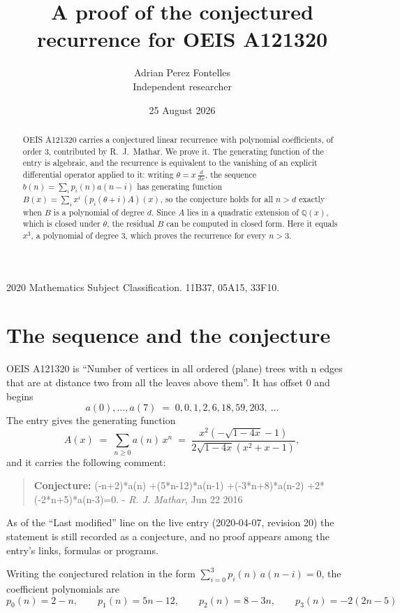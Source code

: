 \documentclass[11pt,a4paper]{article}
\title{A proof of the conjectured recurrence for OEIS A121320}
\author{Adrian Perez Fontelles\\ \small Independent researcher}
\date{25 August 2026}
\theoremstyle{plain}
\theoremstyle{definition}
\begin{document}
\maketitle

\begin{abstract}
OEIS A121320 carries a conjectured linear recurrence with polynomial coefficients, of
order 3, contributed by R.~J.~Mathar. We prove it. The generating function of the
entry is algebraic, and the recurrence is equivalent to the vanishing of an explicit
differential operator applied to it: writing $\theta=x\,\frac{d}{dx}$, the sequence
$b(n)=\sum_{i}p_{i}(n)a(n-i)$ has generating function
$B(x)=\sum_{i}x^{i}\,(p_{i}(\theta+i)A)(x)$, so the conjecture holds for all $n>d$ exactly
when $B$ is a polynomial of degree $d$. Since $A$ lies in a quadratic extension of
$\mathbb{Q}(x)$, which is closed under $\theta$, the residual $B$ can be computed in
closed form. Here it equals $x^{3}$, a polynomial of degree $3$, which proves
the recurrence for every $n>3$.
\end{abstract}

\noindent\small 2020 Mathematics Subject Classification. 11B37, 05A15, 33F10.\normalsize

\section{The sequence and the conjecture}

OEIS A121320 is ``Number of vertices in all ordered (plane) trees with n edges that are at distance two from all the leaves above them''. It has offset $0$ and begins
\[
a(0),\dots,a(7)\;=\;0, 0, 1, 2, 6, 18, 59, 203,\ \dots
\]
The entry gives the generating function
\begin{equation}\label{eq:gf}
A(x)\;=\;\sum_{n\ge 0} a(n)\,x^{n}\;=\;\frac{x^{2} \left(- \sqrt{1 - 4 x} - 1\right)}{2 \sqrt{1 - 4 x} \left(x^{2} + x - 1\right)} ,
\end{equation}
and it carries the following comment:
\begin{quote}\small
\textbf{Conjecture:} (-n+2)*a(n) +(5*n-12)*a(n-1) +(-3*n+8)*a(n-2) +2*(-2*n+5)*a(n-3)=0. - \emph{R. J. Mathar}, Jun 22 2016
\end{quote}
As of the ``Last modified'' line on the live entry (2020-04-07, revision 20) the
statement is still recorded as a conjecture, and no proof appears among the entry's links,
formulas or programs.

Writing the conjectured relation in the form $\sum_{i=0}^{3}p_{i}(n)\,a(n-i)=0$,
the coefficient polynomials are
\[
p_{0}(n)=2 - n,\qquad p_{1}(n)=5 n - 12,\qquad p_{2}(n)=8 - 3 n,\qquad p_{3}(n)=- 2 \left(2 n - 5\right)
\]
\end{document}
